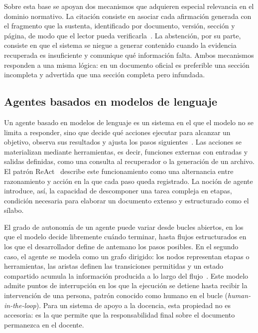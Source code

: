 Sobre esta base se apoyan dos mecanismos que adquieren especial relevancia en el dominio normativo. La citación consiste en asociar cada afirmación generada con el fragmento que la sustenta, identificado por documento, versión, sección y página, de modo que el lector pueda verificarla~\cite{gao2023alce}. La abstención, por su parte, consiste en que el sistema se niegue a generar contenido cuando la evidencia recuperada es insuficiente y comunique qué información falta. Ambos mecanismos responden a una misma lógica: en un documento oficial es preferible una sección incompleta y advertida que una sección completa pero infundada.

\subsection{Agentes basados en modelos de lenguaje}
Un agente basado en modelos de lenguaje es un sistema en el que el modelo no se limita a responder, sino que decide qué acciones ejecutar para alcanzar un objetivo, observa sus resultados y ajusta los pasos siguientes~\cite{wang2024agentsurvey}. Las acciones se materializan mediante herramientas, es decir, funciones externas con entradas y salidas definidas, como una consulta al recuperador o la generación de un archivo. El patrón ReAct~\cite{yao2023react} describe este funcionamiento como una alternancia entre razonamiento y acción en la que cada paso queda registrado. La noción de agente introduce, así, la capacidad de descomponer una tarea compleja en etapas, condición necesaria para elaborar un documento extenso y estructurado como el sílabo.

El grado de autonomía de un agente puede variar desde bucles abiertos, en los que el modelo decide libremente cuándo terminar, hasta flujos estructurados en los que el desarrollador define de antemano los pasos posibles. En el segundo caso, el agente se modela como un grafo dirigido: los nodos representan etapas o herramientas, las aristas definen las transiciones permitidas y un estado compartido acumula la información producida a lo largo del flujo~\cite{langgraph2024}. Este modelo admite puntos de interrupción en los que la ejecución se detiene hasta recibir la intervención de una persona, patrón conocido como humano en el bucle (\textit{human-in-the-loop}). Para un sistema de apoyo a la docencia, esta propiedad no es accesoria: es la que permite que la responsabilidad final sobre el documento permanezca en el docente.

